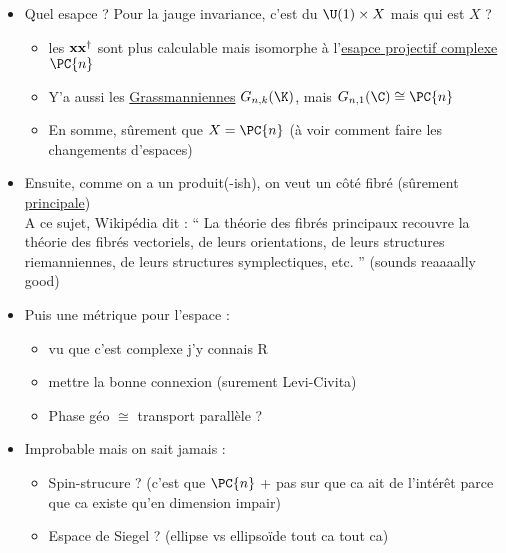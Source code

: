 \begin{itemize}
	
	\item Quel esapce ? Pour la jauge invariance, c'est du $\U(1)\times X$ mais qui est $X$ ? 
	\begin{itemize}
		\item les $\bf{x}\bf{x}^\dagger$ sont plus calculable mais isomorphe à l'\href{https://en.wikipedia.org/wiki/Complex_projective_space#Differential_geometry}{esapce projectif complexe} $\PC{n}$
		
		\item Y'a aussi les \href{https://fr.wikipedia.org/wiki/Grassmannienne}{Grassmanniennes} $G_{n,k}(\K)$, mais $G_{n, 1}(\C)\cong \PC{n}$
		
		\item En somme, sûrement que $X=\PC{n}$ (à voir comment faire les changements d'espaces)
	
	\end{itemize}
	
	\item Ensuite, comme on a un produit(-ish), on veut un côté fibré (sûrement \href{https://fr.wikipedia.org/wiki/Fibr%C3%A9_principal}{principale}) \\
	A ce sujet, Wikipédia dit : `` La théorie des fibrés principaux recouvre la théorie des fibrés vectoriels, de leurs orientations, de leurs structures riemanniennes, de leurs structures symplectiques, etc. '' (sounds reaaaally good)
	
	\item Puis une métrique pour l'espace :
	\begin{itemize}
		
		\item vu que c'est complexe j'y connais R
		
		\item mettre la bonne connexion (surement Levi-Civita)
		
		\item Phase géo $\cong$ transport parallèle ?
	\end{itemize} 
	
	\item Improbable mais on sait jamais :
	\begin{itemize}
		\item Spin-strucure ? (c'est que $\PC{n}$ + pas sur que ca ait de l'intérêt parce que ca existe qu'en dimension impair)
		
		\item Espace de Siegel ? (ellipse vs ellipsoïde tout ca tout ca)
	\end{itemize}
\end{itemize}




